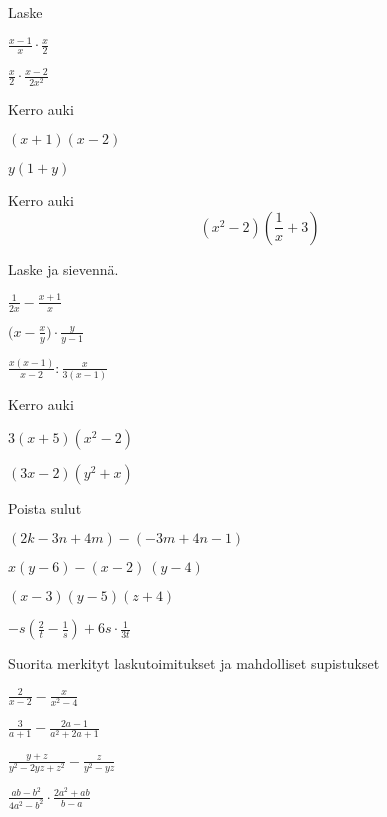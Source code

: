 \begin{tehtava}
Laske
\begin{kohdat}
\item \(\displaystyle \frac{x-1}{x} \cdot \frac{x}{2}\)
\item \(\displaystyle \frac{x}{2} \cdot \frac{x-2}{2x^2}\)
\end{kohdat}
\end{tehtava}

\begin{tehtava}
Kerro auki
\begin{kohdat}
\item \((x + 1) (x - 2)\)
\item \(y(1+y)\)
\end{kohdat}
\end{tehtava}

\begin{tehtava}
Kerro auki\[(x^2-2)\left( \frac{1}{x} + 3 \right)\]
\end{tehtava}

\begin{tehtava}
Laske ja sievennä.
\begin{kohdat}
\item \(\displaystyle \frac{1}{2x} - \frac{x + 1}{x}\)
\item \(\displaystyle \bigl(x - \frac{x}{y}\bigr)\cdot \frac{y}{y - 1}\)
\item \(\displaystyle \frac{x(x-1)}{x-2} : \frac{x}{3(x-1)}\)
\end{kohdat}
\end{tehtava}

\begin{tehtava}
Kerro auki
\begin{kohdat}
\item \(3(x+5)(x^2-2)\)
\item \((3x-2)(y^2+x)\)
\end{kohdat}
\end{tehtava}

\begin{tehtava}
Poista sulut
\begin{kohdat}
\item \((2k-3n+4m)-(-3m+4n-1)\)
\item \(x(y-6) - (x-2)\ (y-4)\)
\item \((x-3)(y-5)(z+4)\)
\item \(\displaystyle-s\left(\frac{2}{t}-\frac{1}{s}\right) + 6s \cdot \frac{1}{3t}\)
\end{kohdat}
\end{tehtava}

\begin{tehtava}
Suorita merkityt laskutoimitukset ja mahdolliset supistukset
\begin{kohdat}
\item \(\displaystyle \frac{2}{x-2} - \frac{x}{x^2-4}\)
\item \(\displaystyle \frac{3}{a + 1} - \frac{2a-1}{a^2 + 2a + 1}\)
\item \(\displaystyle \frac{y + z}{y^2 - 2yz + z^2} - \frac{z}{y^2 - yz}\)
\item \(\displaystyle \frac{ab-b^2}{4a^2 - b^2}\cdot \frac{2a^2 + ab}{b-a}\)
\end{kohdat}
\end{tehtava}
